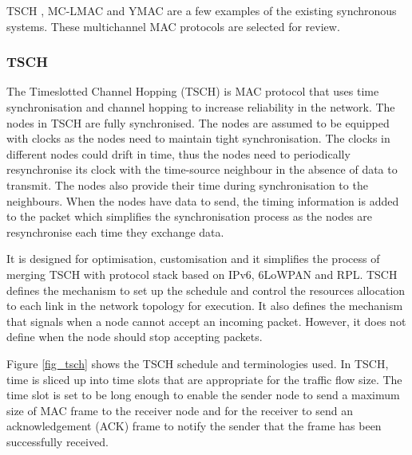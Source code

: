 TSCH \cite{tsch}, MC-LMAC \cite{mc-lmac} and YMAC \cite{y-mac} are a few examples of the existing synchronous systems. These multichannel MAC protocols are selected for review. 






\subsubsection{TSCH}
The Timeslotted Channel Hopping (TSCH) \cite{tsch} is MAC protocol that uses time synchronisation and channel hopping to increase reliability in the network. The nodes in TSCH are fully synchronised. The nodes are assumed to be equipped with clocks as the nodes need to maintain tight synchronisation. The clocks in different nodes could drift in time, thus the nodes need to periodically resynchronise its clock with the time-source neighbour in the absence of data to transmit. The nodes also provide their time during synchronisation to the neighbours. When the nodes have data to send, the timing information is added to the packet which simplifies the synchronisation process as the nodes are resynchronise each time they exchange data.

It is designed for optimisation, customisation and it simplifies the process of merging TSCH with protocol stack based on IPv6, 6LoWPAN and RPL. TSCH defines the mechanism to set up the schedule and control the resources allocation to each link in the network topology for execution. It also defines the mechanism that signals when a node cannot accept an incoming packet. However, it does not define when the node should stop accepting packets.

Figure \ref{fig_tsch} shows the TSCH schedule and terminologies used. In TSCH, time is sliced up into time slots that are appropriate for the traffic flow size. The time slot is set to be long enough to enable the sender node to send a maximum size of MAC frame to the receiver node and for the receiver to send an acknowledgement (ACK) frame to notify the sender that the frame has been successfully received.

